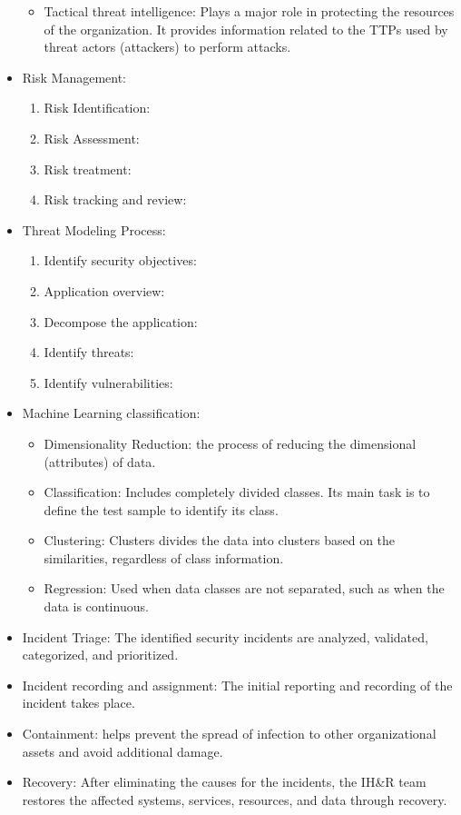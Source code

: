 \begin{itemize}
\begin{itemize}
        \item Tactical threat intelligence: Plays a major role in protecting the resources of the organization. It provides information related to the TTPs used by threat actors (attackers) to perform attacks.
    \end{itemize}
    \item Risk Management:
    \begin{enumerate}
        \item Risk Identification:
        \item Risk Assessment:
        \item Risk treatment:
        \item Risk tracking and review:
    \end{enumerate}
    \item Threat Modeling Process:
    \begin{enumerate}
        \item Identify security objectives:
        \item Application overview:
        \item Decompose the application:
        \item Identify threats:
        \item Identify vulnerabilities:
    \end{enumerate}
    \item Machine Learning classification:
    \begin{itemize}
        \item Dimensionality Reduction: the process of reducing the dimensional (attributes) of data.
        \item Classification: Includes completely divided classes. Its main task is to define the test sample to identify its class.
        \item Clustering: Clusters divides the data into clusters based on the similarities, regardless of class information.
        \item Regression: Used when data classes are not separated, such as when the data is continuous.
    \end{itemize}
    \item Incident Triage: The identified security incidents are analyzed, validated, categorized, and prioritized.
    \item Incident recording and assignment: The initial reporting and recording of the incident takes place.
    \item Containment: helps prevent the spread of infection to other organizational assets and avoid additional damage.
    \item Recovery: After eliminating the causes for the incidents, the IH\&R team restores the affected systems, services, resources, and data through recovery.
\end{itemize}




